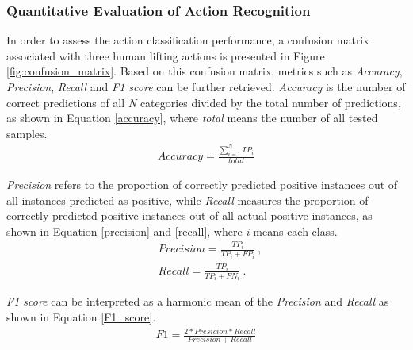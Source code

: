 \subsubsection{Quantitative Evaluation of Action Recognition}
\label{sec: analysis action recognition}
In order to assess the action classification performance, a confusion matrix associated with three human lifting actions is presented in Figure \ref{fig:confusion_matrix}.
Based on this confusion matrix, metrics such as \emph{Accuracy}, \emph{Precision}, \emph{Recall} and \emph{F1 score} can be further retrieved. \emph{Accuracy} is the number of correct predictions of all \emph{N} categories divided by the total number of predictions, as shown in Equation \ref{accuracy}, where \emph{total} means the number of all tested samples.
\begin{equation} \label{accuracy}
\begin{split}
Accuracy = \frac{\sum_{i=1}^{N}TP_i}{total}
\end{split}
\end{equation}

\emph{Precision} refers to the proportion of correctly predicted positive instances out of all instances predicted as positive, while \emph{Recall} measures the proportion of correctly predicted positive instances out of all actual positive instances, as shown in Equation \ref{precision} and \ref{recall}, where \emph{i} means each class.
\begin{subequations}
\begin{align} \label{precision}
& Precision = \frac{TP_i}{TP_i + FP_i} ~,\\
\label{recall}
& Recall = \frac{TP_i}{TP_i + FN_i} ~.
\end{align}
\end{subequations}

\emph{F1 score} can be interpreted as a harmonic mean of the \emph{Precision} and \emph{Recall} as shown in Equation \ref{F1_score}.
\begin{equation} \label{F1_score}
\begin{split}
F1 = \frac{2 * Presicion * Recall}{Precision + Recall}
\end{split}
\end{equation}

